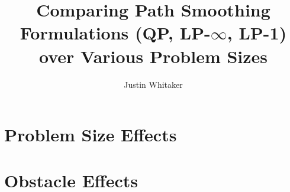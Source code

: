 \documentclass[conference]{IEEEtran}
\begin{document}
\title{Comparing Path Smoothing Formulations (QP, LP-$\infty$, LP-1) over Various Problem Sizes}
\author{Justin Whitaker}

\maketitle

% 

\section{Problem Size Effects} \label{sec:prob_size_effects}


\section{Obstacle Effects} \label{sec:obstacle_effects}


% 
% 
\end{document}

